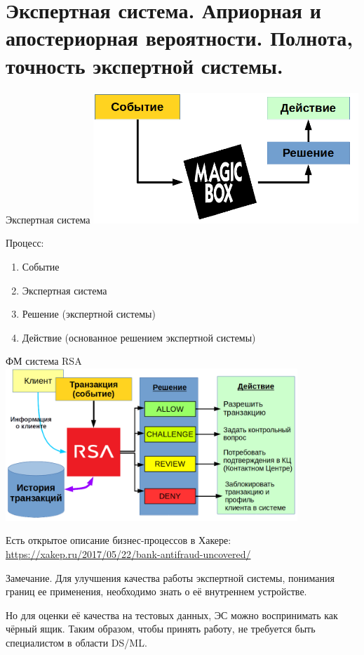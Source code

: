   \section{Экспертная система. Априорная и апостериорная вероятности. Полнота, точность экспертной системы.}\label{section:expert_systems_recall_presision}
  
  \begin{frame}{Экспертная система}
   \includegraphics[width=10cm]{../pic/expert_system_1.png}
  
  Процесс:
  \begin{enumerate}
  	\item Событие
  	\item Экспертная система
  	\item Решение (экспертной системы)
  	\item Действие (основанное решением экспертной системы)
  \end{enumerate}
  \end{frame}

  \begin{frame}{ФМ система RSA}
   \includegraphics[width=11cm]{../pic/expert_system_rsa.png}
  
  Есть открытое описание бизнес-процессов в Хакере:
  \url{https://xakep.ru/2017/05/22/bank-antifraud-uncovered/}
  \end{frame}
  
  \begin{frame}
  	\begin{block}{Замечание.}
  		Для улучшения качества работы экспертной системы, понимания границ ее применения,
  		необходимо знать о её внутреннем устройстве.
  		
  		Но для оценки её качества на тестовых данных, ЭС можно воспринимать как чёрный ящик.
  		Таким образом, чтобы принять работу, не требуется быть специалистом в области DS/ML.
  	\end{block}
  \end{frame}

